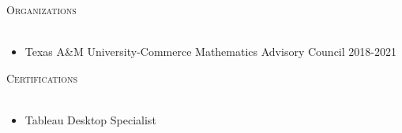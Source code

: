 \documentclass[a4paper]{article}
\newcommand{\lineunder} {
    \vspace*{-8pt} \\
    \hspace*{-18pt} \hrulefill \\
}
\newcommand{\header} [1] {
    {\hspace*{-18pt}\vspace*{6pt} \textsc{#1}}
    \vspace*{-6pt} \lineunder
}
\begin{document}
\header{Organizations}
\begin{itemize} \itemsep .5pt
	\item Texas A\&M University-Commerce Mathematics Advisory Council 2018-2021
\end{itemize}
\vspace{2mm}

\header{Certifications}
\begin{itemize} \itemsep .5pt
	\item Tableau Desktop Specialist
\end{itemize}
\vspace{2mm}
\ 
\end{document}
